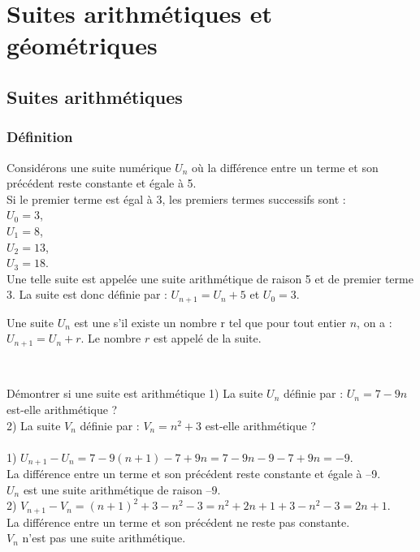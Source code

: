 \chapter{Suites arithmétiques et géométriques}
\thispagestyle{fancy}

\section{Suites arithmétiques}

\subsection{Définition}

\begin{exemple}
    Considérons une suite numérique $U_n$ où la différence entre un terme et son précédent reste constante et égale à 5.\\
    Si le premier terme est égal à 3, les premiers termes successifs sont :\\
    $U_0 = 3$,\\
    $U_1 = 8$,\\
    $U_2 = 13$,\\
    $U_3 = 18$.\\
    Une telle suite est appelée une suite arithmétique de raison 5 et de premier terme 3.
    La suite est donc définie par : $U_{n+1}=U_n+5$ et $U_0=3$.
\end{exemple}

\begin{definition}
    Une suite $U_n$ est une  s'il existe un nombre r tel que pour tout entier $n$, on a : $U_{n+1}=U_n+r$.
    Le nombre $r$ est appelé  de la suite.
\end{definition}
\ \\
\begin{demonstrationTitre}{Démontrer si une suite est arithmétique}
    1) La suite $U_n$ définie par : $U_n=7-9n$ est-elle arithmétique ?\\
    2) La suite $V_n$ définie par : $V_n=n^2+3$ est-elle arithmétique ?\\
    \\
    1) $U_{n+1}-U_n=7-9(n+1)-7+9n=7-9n-9-7+9n=-9$.\\
    La différence entre un terme et son précédent reste constante et égale à –9.\\
    $U_n$ est une suite arithmétique de raison $–9$.\\
    
    2) $V_{n+1}-V_n=(n+1)^2+3-n^2-3=n^2+2n+1+3-n^2-3=2n+1$.\\
    La différence entre un terme et son précédent ne reste pas constante.\\
    $V_n$ n'est pas une suite arithmétique.
\end{demonstrationTitre}

